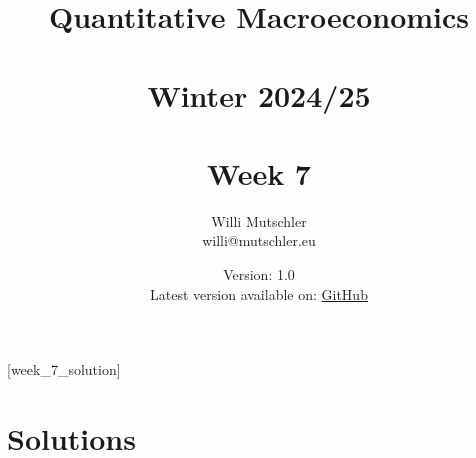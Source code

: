 
\newif\ifDisplaySolutions\DisplaySolutionstrue%


\title{Quantitative Macroeconomics\\~\\Winter 2024/25\\~\\Week 7}
\author{Willi Mutschler\\willi@mutschler.eu}
\date{Version: 1.0\\Latest version available on: \href{https://github.com/wmutschl/Quantitative-Macroeconomics/releases/latest/download/week_7.pdf}{GitHub}}
\maketitle\thispagestyle{empty}

\newpage
{}[week_7_solution]
\tableofcontents\thispagestyle{empty}\newpage

\setcounter{page}{1}
\newpage
\newpage
\newpage
\printbibliography%
\newpage

\ifDisplaySolutions%
\newpage
\appendix
\section{Solutions}

\fi
